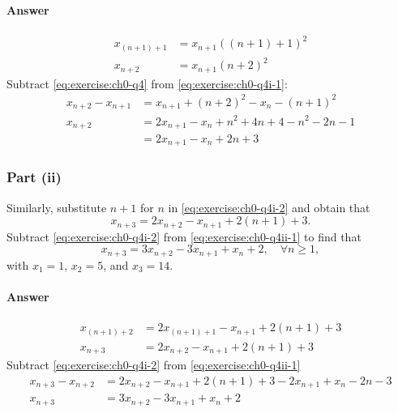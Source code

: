 \paragraph{Answer}
\begin{align*}
    x_{(n + 1) + 1} &= x_{n + 1} ((n + 1) + 1)^2 \\
    x_{n + 2} &= x_{n + 1} (n + 2)^2
\end{align*}
Subtract \eqref{eq:exercise:ch0-q4} from \eqref{eq:exercise:ch0-q4i-1}:
\begin{align*}
    x_{n + 2} - x_{n + 1} &= x_{n + 1} + (n + 2)^2 - x_n - (n + 1)^2 \\
    x_{n + 2} &= 2 x_{n + 1} - x_n + n^2 + 4 n + 4 - n^2 - 2 n - 1 \\
              &= 2 x_{n + 1} - x_n + 2 n + 3
\end{align*}

\subsubsection{Part (ii)}
Similarly, substitute $ n + 1 $ for $ n $ in \eqref{eq:exercise:ch0-q4i-2} and
    obtain that
\begin{equation}
    x_{n + 3} = 2 x_{n + 2} - x_{n + 1} + 2(n + 1) + 3.
    \label{eq:exercise:ch0-q4ii-1}
\end{equation}
Subtract \eqref{eq:exercise:ch0-q4i-2} from \eqref{eq:exercise:ch0-q4ii-1} to
    find that
\begin{equation}
    x_{n + 3} = 3 x_{n + 2} - 3 x_{n + 1} + x_n + 2, \quad \forall n \geq 1,
    \label{eq:exercise:ch0-q4ii-2}
\end{equation}
with $ x_1 = 1 $, $ x_2 = 5 $, and $ x_3 = 14 $.

\paragraph{Answer}
\begin{align*}
    x_{(n + 1) + 2} &= 2 x_{(n + 1) + 1} - x_{n + 1} + 2(n + 1) + 3 \\
    x_{n + 3} &= 2 x_{n + 2} - x_{n + 1} + 2(n + 1) + 3
\end{align*}
Subtract \eqref{eq:exercise:ch0-q4i-2} from \eqref{eq:exercise:ch0-q4ii-1}
\begin{align*}
    x_{n + 3} - x_{n + 2} &= 2 x_{n + 2} - x_{n + 1} + 2(n + 1) + 3 -
        2 x_{n + 1} + x_n - 2 n - 3 \\
    x_{n + 3} &= 3 x_{n + 2} -3 x_{n + 1} + x_n + 2
\end{align*}

